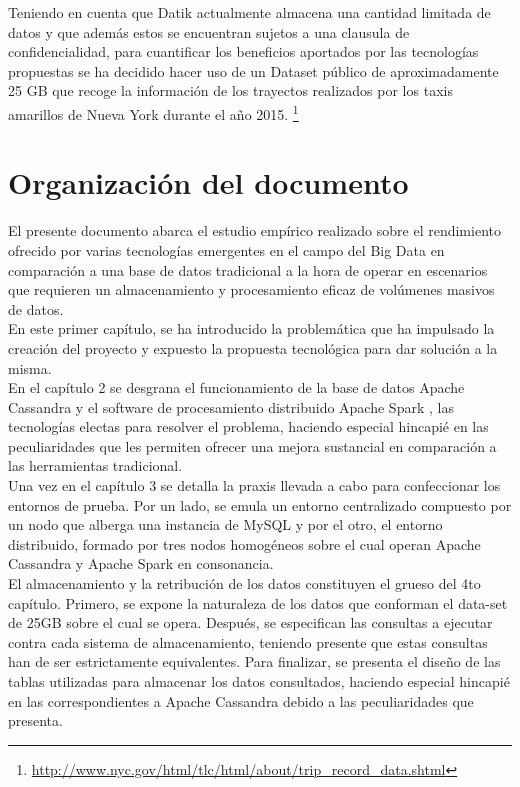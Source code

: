 Teniendo en cuenta que Datik actualmente almacena una cantidad limitada de datos y que además estos se encuentran sujetos a una clausula de confidencialidad, para cuantificar los beneficios aportados por las tecnologías propuestas se ha decidido hacer uso de un Dataset público de aproximadamente 25 GB que recoge la información de los trayectos realizados por los taxis amarillos de Nueva York durante el año 2015. \footnote{\url{http://www.nyc.gov/html/tlc/html/about/trip_record_data.shtml}}

\section{Organización del documento}

El presente documento abarca el estudio empírico realizado sobre el rendimiento ofrecido por varias tecnologías emergentes en el campo del Big Data en comparación a una base de datos tradicional a la hora de operar en escenarios que requieren un almacenamiento y procesamiento eficaz de volúmenes masivos de datos.\\

En este primer capítulo, se ha introducido la problemática que ha impulsado la creación del proyecto y expuesto la propuesta tecnológica para dar solución a la misma.\\

En el capítulo 2 se desgrana el funcionamiento de la base de datos Apache Cassandra \cite{lakshman2010cassandra} y el software de procesamiento distribuido Apache Spark \cite{zaharia2010spark}, las tecnologías electas para resolver el problema, haciendo especial hincapié en las peculiaridades que les permiten ofrecer una mejora sustancial en comparación a las herramientas tradicional.\\

Una vez en el capítulo 3 se detalla la praxis llevada a cabo para confeccionar los entornos de prueba. Por un lado, se emula un entorno centralizado compuesto por un nodo que alberga una instancia de MySQL y por el otro, el entorno distribuido, formado por tres nodos homogéneos sobre el cual operan Apache Cassandra y Apache Spark en consonancia.\\ 

El almacenamiento y la retribución de los datos constituyen el grueso del 4to capítulo. Primero, se expone la naturaleza de los datos que conforman el data-set de 25GB sobre el cual se opera. Después, se especifican las consultas a ejecutar contra cada sistema de almacenamiento, teniendo presente que estas consultas han de ser estrictamente equivalentes. Para finalizar, se presenta el diseño de las tablas utilizadas para almacenar los datos consultados, haciendo especial hincapié en las correspondientes a Apache Cassandra debido a las peculiaridades que presenta.\\ 

